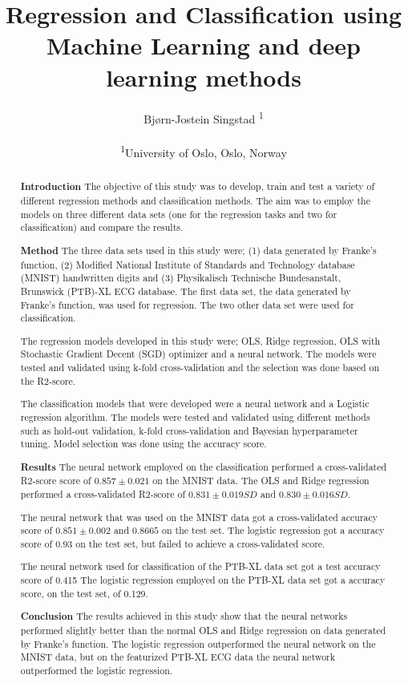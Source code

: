 \documentclass[twocolumn]{cinc}
\title{Regression and Classification using Machine Learning and deep learning methods}
\author{Bjørn-Jostein Singstad \textsuperscript{1}\\ \ \\
\textsuperscript{1}University of Oslo, Oslo, Norway}
\begin{document}
\maketitle

\begin{abstract}

\textbf{Introduction}
The objective of this study was to develop, train and test a variety of different regression methods and classification methods. The aim was to employ the models on three different data sets (one for the regression tasks and two for classification) and compare the results.

\textbf{Method}
The three data sets used in this study were; (1) data generated by Franke's function, (2) Modified National Institute of Standards and Technology database (MNIST) handwritten digits and (3) Physikalisch Technische Bundesanstalt, Brunswick (PTB)-XL ECG database. The first data set, the data generated by Franke's function, was used for regression. The two other data set were used for classification.

The regression models developed in this study were;  OLS, Ridge regression, OLS with Stochastic Gradient Decent (SGD) optimizer and a neural network. The models were tested and validated using k-fold cross-validation and the selection was done based on the R2-score. 

The classification models that were developed were a neural network and a Logistic regression algorithm. The models were tested and validated using different methods such as hold-out validation, k-fold cross-validation and Bayesian hyperparameter tuning. Model selection was done using the accuracy score. 

\textbf{Results}
The neural network employed on the classification performed a cross-validated R2-score score of $0.857 \pm0.021$ on the MNIST data. The OLS and Ridge regression performed a cross-validated R2-score of $0.831\pm0.019SD$ and $0.830\pm0.016SD$. 

The neural network that was used on the MNIST data got a cross-validated accuracy score of $0.851\pm0.002$ and $0.8665$ on the test set. The logistic regression got a accuracy score of $0.93$ on the test set, but failed to achieve a cross-validated score.

The neural network used for classification of the PTB-XL data set got a test accuracy score of 0.415
The logistic regression employed on the PTB-XL data set got a accuracy score, on the test set, of 0.129.

\textbf{Conclusion}
The results achieved in this study show that the neural networks performed slightly better than the normal OLS and Ridge regression on data generated by Franke's function. The logistic regression outperformed the neural network on the MNIST data, but on the featurized PTB-XL ECG data the neural network outperformed the logistic regression.

\end{abstract}
\end{document}
